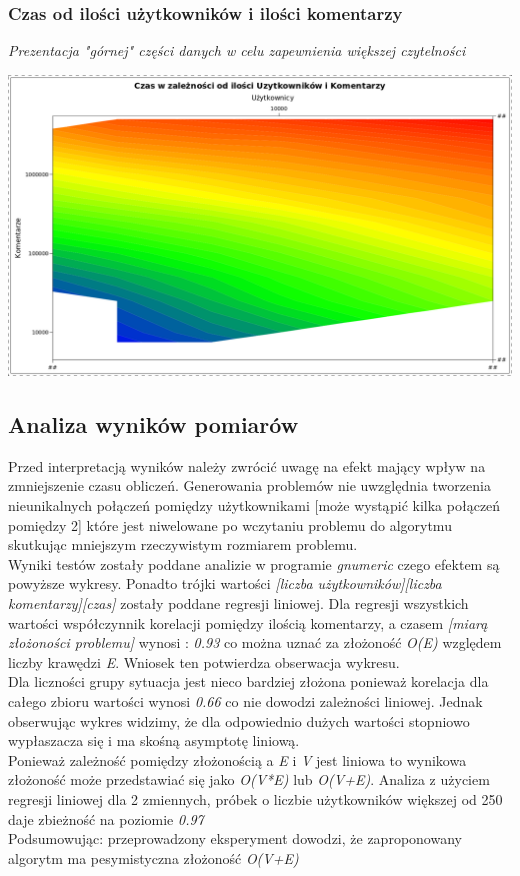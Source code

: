 \documentclass[11pt]{article}
\newcommand{\+}{\discretionary{\mbox{\scriptsize$\hookleftarrow$}}{}{}}
\begin{document}
\subsubsection{Czas od ilości użytkowników i ilości komentarzy}
\textsl{Prezentacja "górnej" części danych w celu zapewnienia większej czytelności}\\
\begin{centering}
	\includegraphics[width=\textwidth]{Wykres3}
\end{centering}
\subsection{Analiza wyników pomiarów}
Przed interpretacją wyników należy zwrócić uwagę na efekt mający wpływ na zmniejszenie czasu obliczeń. Generowania problemów nie uwzględnia tworzenia nieunikalnych połączeń pomiędzy użytkownikami [może wystąpić kilka połączeń pomiędzy 2] które jest niwelowane po wczytaniu problemu do algorytmu skutkując mniejszym rzeczywistym rozmiarem problemu.
\\
Wyniki testów zostały poddane analizie w programie \textit{gnumeric} czego efektem są powyższe wykresy. Ponadto trójki wartości \textit{[liczba użytkowników][liczba komentarzy][czas]} zostały poddane regresji liniowej. Dla regresji wszystkich wartości współczynnik korelacji pomiędzy ilością komentarzy, a czasem \textit{[miarą złożoności problemu]} wynosi : \textit{0.93} co można uznać za złożoność \textit{O(E)} względem liczby krawędzi \textit{E}. Wniosek ten potwierdza obserwacja wykresu.
\\
Dla liczności grupy sytuacja jest nieco bardziej złożona ponieważ korelacja dla całego zbioru wartości wynosi \textit{0.66} co nie dowodzi zależności liniowej. Jednak  
obserwując wykres widzimy, że dla odpowiednio dużych wartości stopniowo wypłaszacza się i ma skośną asymptotę liniową.
\\
Ponieważ zależność pomiędzy złożonością a \textit{E} i \textit{V} jest liniowa to wynikowa złożoność może przedstawiać się jako \textit{O(V*E)} lub \textit{O(V+E)}. Analiza z użyciem regresji liniowej dla 2 zmiennych, próbek o liczbie użytkowników większej od 250 daje zbieżność na poziomie \textit{0.97} 
\\ 
Podsumowując: przeprowadzony eksperyment dowodzi, że zaproponowany algorytm ma pesymistyczna złożoność \textit{O(V+E)}
\clearpage  
\end{document}
